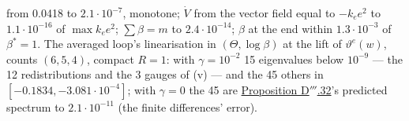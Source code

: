 \begin{sloppypar}
from 0.0418 to $2.1\cdot10^{-7}$, monotone; $\dot V$ from the vector field equal to $-k_ee^2$ to $1.1\cdot10^{-16}$
of $\max k_ee^2$; $\sum\beta = m$ to $2.4\cdot10^{-14}$; $\beta$ at the end within $1.3\cdot10^{-3}$ of
$\beta^* = 1$. The averaged loop's linearisation in $(\Theta,\log\beta)$ at the lift of $\vartheta^e(w)$, counts
$(6,5,4)$, compact $R = 1$: with $\gamma = 10^{-2}$ 15 eigenvalues below $10^{-9}$ --- the 12 redistributions and the
3 gauges of (v) --- and the 45 others in $[-0.1834,-3.081\cdot10^{-4}]$; with $\gamma = 0$ the 45 are
\hyperref[res:thmDppp:32]{Proposition D$'''$.32}'s predicted spectrum to $2.1\cdot10^{-11}$ (the finite differences'
error).
\end{sloppypar}


